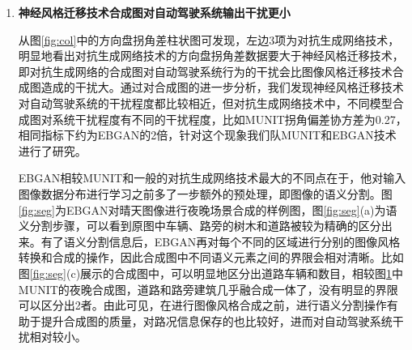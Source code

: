 \begin{enumerate}[itemindent=40pt, listparindent = 0.7cm, label={发现\arabic*:}]
    \begin{figure}[h]
        \centering
        \texttt{[image: gan\_bad]}
        \texttt{[image: models/EBGAN/8]}
        \texttt{[image: models/GAN/1]}
        \caption{MUNIT合成图像样本}
        \label{fig:gan}
    \end{figure}
    
    大部分的对抗生成网络技术中，合成数据的质量主要依赖于系统中的生成器对于原始数据分布的学习能力，以图像数据的生成为例，生成器在学习原图像数据分布时并没有对远图像的语义和风格信息作特殊处理，对图像内容的语义信息也没有类似于语义分割的处理，它是将原图像数据当做一个整体进行数据分布的学习，因此往往会导致最后判别器产生的合成图是对原始图的全盘模拟，特别的当输入数据由风格图和内容图两张图组成时，合成图会展现出两者的综合效果，例如图\ref{fig:gan}展示的,可以发现合成图不仅有白天的道路信息，风格图存在而原图中不存在的建筑、路灯信息却大量地出现在了合成图中。
    
    虽然从合成图与原图相似度上看，对抗生成网络技术的性能不如神经风格迁移技术，但任何事物都有两面性，因为对抗生成网络合成图与原图的差异性是最大的，因此如果想提高自动驾驶系统测试框架中测试用例的覆盖率，即增加路况图像集的多样性，显然使用对抗生成网络相关技术较神经风格迁移技术而言更加合适。

    \item \textbf{神经风格迁移技术合成图对自动驾驶系统输出干扰更小}
    
    从图\ref{fig:col}中的方向盘拐角差柱状图可发现，左边3项为对抗生成网络技术，明显地看出对抗生成网络技术的方向盘拐角差数据要大于神经风格迁移技术，即对抗生成网络的合成图对自动驾驶系统行为的干扰会比图像风格迁移技术合成图造成的干扰大。通过对合成图的进一步分析，我们发现神经风格迁移技术对自动驾驶系统的干扰程度都比较相近，但对抗生成网络技术中，不同模型合成图对系统干扰程度有不同的干扰程度，比如MUNIT拐角偏差协方差为0.27，相同指标下约为EBGAN的2倍，针对这个现象我们队MUNIT和EBGAN技术进行了研究。

    EBGAN相较MUNIT和一般的对抗生成网络技术最大的不同点在于，他对输入图像数据分布进行学习之前多了一步额外的预处理，即图像的语义分割。图\ref{fig:seg}为EBGAN对晴天图像进行夜晚场景合成的样例图，图\ref{fig:seg}(a)为语义分割步骤，可以看到原图中车辆、路旁的树木和道路被较为精确的区分出来。有了语义分割信息后，EBGAN再对每个不同的区域进行分别的图像风格转换和合成的操作，因此合成图中不同语义元素之间的界限会相对清晰。比如图\ref{fig:seg}(c)展示的合成图中，可以明显地区分出道路车辆和数目，相较图\ref{fig:gan}中MUNIT的夜晚合成图，道路和路旁建筑几乎融合成一体了，没有明显的界限可以区分出2者。由此可见，在进行图像风格合成之前，进行语义分割操作有助于提升合成图的质量，对路况信息保存的也比较好，进而对自动驾驶系统干扰相对较小。　


\end{enumerate}
